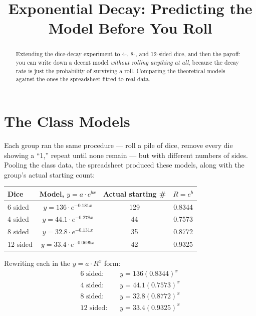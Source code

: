 \documentclass[12pt]{ximera}
\title{Exponential Decay: Predicting the Model Before You Roll}
\begin{document}
\begin{abstract}
Extending the dice-decay experiment to 4-, 8-, and 12-sided dice, and then the payoff:
you can write down a decent model \emph{without rolling anything at all}, because the
decay rate is just the probability of surviving a roll. Comparing the theoretical models
against the ones the spreadsheet fitted to real data.
\end{abstract}
\maketitle

\section*{The Class Models}

Each group ran the same procedure --- roll a pile of dice, remove every die showing a
``1,'' repeat until none remain --- but with different numbers of sides. Pooling the
class data, the spreadsheet produced these models, along with the group's actual starting
count:

\begin{center}
\begin{tabular}{lccc}
\hline
Dice & Model, $y = a \cdot e^{bx}$ & Actual starting \# & $R = e^{b}$ \\
\hline
6 sided  & $y = 136 \cdot e^{-0.181x}$   & 129 & 0.8344 \\
4 sided  & $y = 44.1 \cdot e^{-0.278x}$  & 44  & 0.7573 \\
8 sided  & $y = 32.8 \cdot e^{-0.131x}$  & 35  & 0.8772 \\
12 sided & $y = 33.4 \cdot e^{-0.0699x}$ & 42  & 0.9325 \\
\hline
\end{tabular}
\end{center}

Rewriting each in the $y = a \cdot R^x$ form:
\begin{align*}
\text{6 sided:} \quad & y = 136(0.8344)^x \\
\text{4 sided:} \quad & y = 44.1(0.7573)^x \\
\text{8 sided:} \quad & y = 32.8(0.8772)^x \\
\text{12 sided:} \quad & y = 33.4(0.9325)^x
\end{align*}
\end{document}
